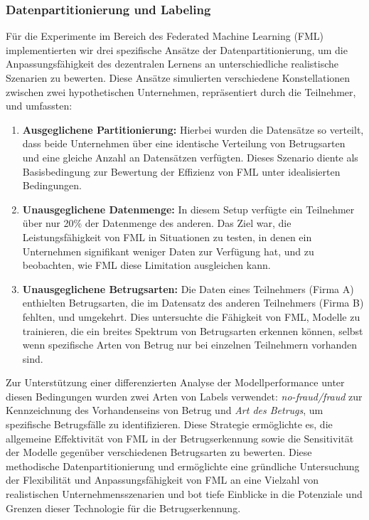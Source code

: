 \documentclass[11pt]{article}
\begin{document}
\subsubsection{Datenpartitionierung und Labeling}

Für die Experimente im Bereich des Federated Machine Learning (FML) implementierten wir drei spezifische Ansätze der Datenpartitionierung, um die Anpassungsfähigkeit des dezentralen Lernens an unterschiedliche realistische Szenarien zu bewerten. Diese Ansätze simulierten verschiedene Konstellationen zwischen zwei hypothetischen Unternehmen, repräsentiert durch die Teilnehmer, und umfassten:

\begin{enumerate}
    \item \textbf{Ausgeglichene Partitionierung:} Hierbei wurden die Datensätze so verteilt, dass beide Unternehmen über eine identische Verteilung von Betrugsarten und eine gleiche Anzahl an Datensätzen verfügten. Dieses Szenario diente als Basisbedingung zur Bewertung der Effizienz von FML unter idealisierten Bedingungen.
    
    \item \textbf{Unausgeglichene Datenmenge:} In diesem Setup verfügte ein Teilnehmer über nur 20\% der Datenmenge des anderen. Das Ziel war, die Leistungsfähigkeit von FML in Situationen zu testen, in denen ein Unternehmen signifikant weniger Daten zur Verfügung hat, und zu beobachten, wie FML diese Limitation ausgleichen kann.
    
    \item \textbf{Unausgeglichene Betrugsarten:} Die Daten eines Teilnehmers (Firma A) enthielten Betrugsarten, die im Datensatz des anderen Teilnehmers (Firma B) fehlten, und umgekehrt. Dies untersuchte die Fähigkeit von FML, Modelle zu trainieren, die ein breites Spektrum von Betrugsarten erkennen können, selbst wenn spezifische Arten von Betrug nur bei einzelnen Teilnehmern vorhanden sind.
\end{enumerate}
\newline
Zur Unterstützung einer differenzierten Analyse der Modellperformance unter diesen Bedingungen wurden zwei Arten von Labels verwendet: \textit{no-fraud/fraud} zur Kennzeichnung des Vorhandenseins von Betrug und \textit{Art des Betrugs}, um spezifische Betrugsfälle zu identifizieren. Diese Strategie ermöglichte es, die allgemeine Effektivität von FML in der Betrugserkennung sowie die Sensitivität der Modelle gegenüber verschiedenen Betrugsarten zu bewerten.
\newline
Diese methodische Datenpartitionierung und ermöglichte eine gründliche Untersuchung der Flexibilität und Anpassungsfähigkeit von FML an eine Vielzahl von realistischen Unternehmensszenarien und bot tiefe Einblicke in die Potenziale und Grenzen dieser Technologie für die Betrugserkennung.
\end{document}
